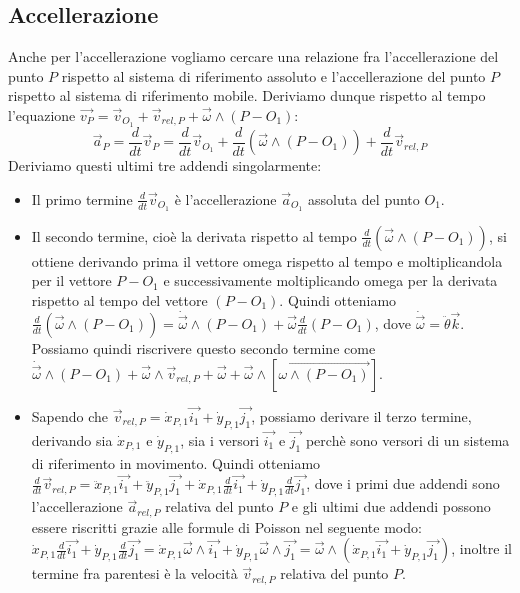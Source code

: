 \subsection{Accellerazione}
Anche per l'accellerazione vogliamo cercare una relazione fra l'accellerazione del punto $P$ rispetto al sistema di riferimento assoluto e l'accellerazione del punto $P$ rispetto al sistema di riferimento mobile.\newline
\newline
Deriviamo dunque rispetto al tempo l'equazione $\vec{v_P} = \vec{v}_{O_1} + \vec{v}_{rel, P} + \vec{\omega} \land (P-O_1)$:
\[
    \vec{a}_P = \frac{d}{dt} \vec{v}_P = \frac{d}{dt} \vec{v}_{O_1} + \frac{d}{dt}(\vec{\omega}\land (P-O_1)) + \frac{d}{dt}\vec{v}_{rel,P}
\]
Deriviamo questi ultimi tre addendi singolarmente:
\begin{itemize}
    \item Il primo termine $\frac{d}{dt} \vec{v}_{O_1}$ è l'accellerazione $\vec{a}_{O_1}$ assoluta del punto $O_1$.
    \item Il secondo termine, cioè la derivata rispetto al tempo $\frac{d}{dt}(\vec{\omega}\land (P-O_1))$, si ottiene derivando prima il vettore omega rispetto al tempo e moltiplicandola per il vettore $P-O_1$ e successivamente moltiplicando omega per la derivata rispetto al tempo del vettore $(P-O_1)$. Quindi otteniamo $\frac{d}{dt}(\vec{\omega}\land (P-O_1)) = \dot{\vec{\omega}} \land (P-O_1) + \vec{\omega} \frac{d}{dt}(P-O_1)$, dove $\dot{\vec{\omega}} = \ddot{\theta} \vec{k}$. Possiamo quindi riscrivere questo secondo termine come $\dot{\vec{\omega}} \land (P-O_1) + \vec{\omega}\land \vec{v}_{rel,P} + \vec{\omega} + \vec{\omega}\land[\vec{\omega \land (P-O_1)}]$.
    \item Sapendo che $\vec{v}_{rel,P} = \dot{x}_{P,1} \vec{i_1} + \dot{y}_{P,1} \vec{j_1}$, possiamo derivare il terzo termine, derivando sia $\dot{x}_{P,1}$ e $\dot{y}_{P,1}$, sia i versori $\vec{i_1}$ e $\vec{j_1}$ perchè sono versori di un sistema di riferimento in movimento.\newline
    Quindi otteniamo $\frac{d}{dt}\vec{v}_{rel,P} = \ddot{x}_{P,1} \vec{i_1} + \ddot{y}_{P,1} \vec{j_1} + \dot{x}_{P,1} \frac{d}{dt} \vec{i_1} + \dot{y}_{P,1} \frac{d}{dt}\vec{j_1}$, dove i primi due addendi sono l'accellerazione $\vec{a}_{rel,P}$ relativa del punto $P$ e gli ultimi due addendi possono essere riscritti grazie alle formule di Poisson nel seguente modo: $\dot{x}_{P,1} \frac{d}{dt} \vec{i_1} + \dot{y}_{P,1} \frac{d}{dt}\vec{j_1} = \dot{x}_{P,1} \vec{\omega}\land \vec{i_1} + \dot{y}_{P,1} \vec{\omega}\land \vec{j_1} = \vec{\omega} \land (\dot{x}_{P,1} \vec{i_1} + \dot{y}_{P,1} \vec{j_1})$, inoltre il termine fra parentesi è la velocità $\vec{v}_{rel,P}$ relativa del punto $P$.
\end{itemize}
